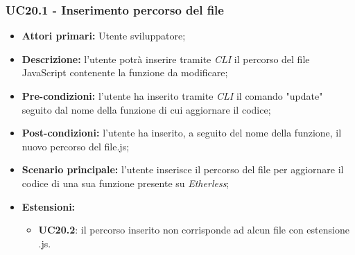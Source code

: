\subsubsection{UC20.1 - Inserimento percorso del file}
\begin{itemize}
	\item \textbf{Attori primari:} Utente sviluppatore;
	\item \textbf{Descrizione:} l'utente potrà inserire tramite \textit{CLI\glo} il percorso del file JavaScript contenente la funzione da modificare;
	\item \textbf{Pre-condizioni:} l'utente ha inserito tramite \textit{CLI\glo} il comando "update" seguito dal nome della funzione di cui aggiornare il codice;
	\item \textbf{Post-condizioni:} l'utente ha inserito, a seguito del nome della funzione, il nuovo percorso del file.js;
	\item \textbf{Scenario principale:} l'utente inserisce il percorso del file per aggiornare il codice di una sua funzione presente su \textit{Etherless};
	\item \textbf{Estensioni:}
	\begin{itemize}
		\item \textbf{UC20.2}: il percorso inserito non corrisponde ad alcun file con estensione .js.
	\end{itemize}
\end{itemize}
